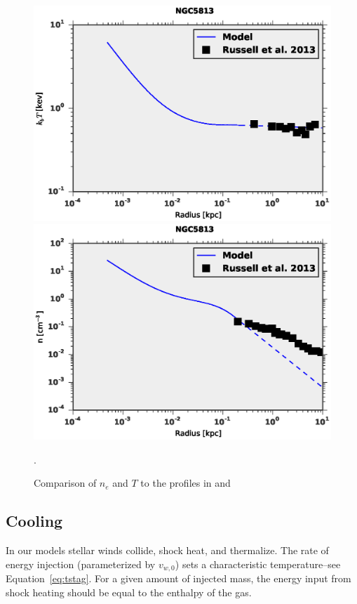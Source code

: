 \documentclass[usenatbib,fleqn]{mn2e}
\newcommand{\vwO}{v_{w,0}}
\begin{document}
\begin{figure}
  \includegraphics[width=\columnwidth]{NGC5813_T.eps}
  \includegraphics[width=\columnwidth]{NGC5813_rho.eps}
  \caption{\label{fig:allen_compare} Comparison of $n_e$ and $T$ to
    the profiles in \citealt{AllenDunn+:2006a} and \citealt{ RussellMcNamara+:2013a}}.
\end{figure}



\subsection{Cooling}
\label{sec:cooling}
In our models stellar winds collide, shock heat, and thermalize. The
rate of energy injection (parameterized by $\vwO$) sets a
characteristic temperature--see Equation~\ref{eq:tstag}.  For a given
amount of injected mass, the energy input from shock heating should be
equal to the enthalpy of the gas.
\end{document}
